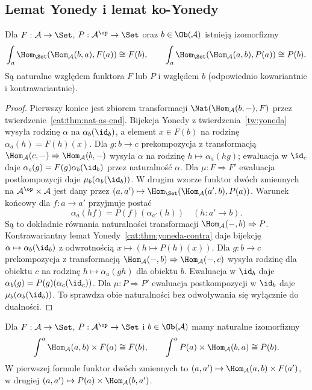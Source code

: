 \subsection{Lemat Yonedy i lemat ko-Yonedy}
\begin{stwierdzenie}\label{cat:prop:yoneda-end}
Dla $F:\mathcal A\to\Set$, $P:\mathcal A^{\op}\to\Set$ oraz $b\in\Ob(\mathcal A)$ istnieją izomorfizmy
\[
 \int_a\Hom_{\Set}(\Hom_{\mathcal A}(b,a),F(a))\cong F(b),
 \qquad
 \int_a\Hom_{\Set}(\Hom_{\mathcal A}(a,b),P(a))\cong P(b).
\]
Są naturalne względem funktora $F$ lub $P$ i względem $b$ (odpowiednio kowariantnie i kontrawariantnie).
\end{stwierdzenie}
\begin{proof}
Pierwszy koniec jest zbiorem transformacji $\Nat(\Hom_{\mathcal A}(b,-),F)$ przez twierdzenie~\ref{cat:thm:nat-as-end}. Bijekcja Yonedy z twierdzenia~\ref{tw:yoneda} wysyła rodzinę $\alpha$ na $\alpha_b(\id_b)$, a element $x\in F(b)$ na rodzinę $\alpha_a(h)=F(h)(x)$. Dla $g:b\to c$ prekompozycja z transformacją $\Hom_{\mathcal A}(c,-)\Rightarrow\Hom_{\mathcal A}(b,-)$ wysyła $\alpha$ na rodzinę $h\mapsto\alpha_a(hg)$; ewaluacja w $\id_c$ daje $\alpha_c(g)=F(g)\alpha_b(\id_b)$ przez naturalność $\alpha$. Dla $\mu:F\Rightarrow F'$ ewaluacja postkompozycji daje $\mu_b(\alpha_b(\id_b))$. W drugim wzorze funktor dwóch zmiennych na $\mathcal A^{\op}\times\mathcal A$ jest dany przez $(a,a')\mapsto\Hom_{\Set}(\Hom_{\mathcal A}(a',b),P(a))$. Warunek końcowy dla $f:a\to a'$ przyjmuje postać
\[
 \alpha_a(hf)=P(f)(\alpha_{a'}(h))
 \quad(h:a'\to b).
\]
Są to dokładnie równania naturalności transformacji $\Hom_{\mathcal A}(-,b)\Rightarrow P$. Kontrawariantny lemat Yonedy~\ref{cat:thm:yoneda-contra} daje bijekcję $\alpha\mapsto\alpha_b(\id_b)$ z odwrotnością $x\mapsto(h\mapsto P(h)(x))$. Dla $g:b\to c$ prekompozycja z transformacją $\Hom_{\mathcal A}(-,b)\Rightarrow\Hom_{\mathcal A}(-,c)$ wysyła rodzinę dla obiektu $c$ na rodzinę $h\mapsto\alpha_a(gh)$ dla obiektu $b$. Ewaluacja w $\id_b$ daje $\alpha_b(g)=P(g)(\alpha_c(\id_c))$. Dla $\mu:P\Rightarrow P'$ ewaluacja postkompozycji w $\id_b$ daje $\mu_b(\alpha_b(\id_b))$. To sprawdza obie naturalności bez odwoływania się wyłącznie do dualności.
\end{proof}
\begin{twierdzenie}\label{cat:thm:co-yoneda}
Dla $F:\mathcal A\to\Set$, $P:\mathcal A^{\op}\to\Set$ i $b\in\Ob(\mathcal A)$ mamy naturalne izomorfizmy
\[
 \int^a\Hom_{\mathcal A}(a,b)\times F(a)\cong F(b),
 \qquad
 \int^a P(a)\times\Hom_{\mathcal A}(b,a)\cong P(b).
\]
W pierwszej formule funktor dwóch zmiennych to $(a,a')\mapsto\Hom_{\mathcal A}(a,b)\times F(a')$, w drugiej $(a,a')\mapsto P(a)\times\Hom_{\mathcal A}(b,a')$.
\end{twierdzenie}
